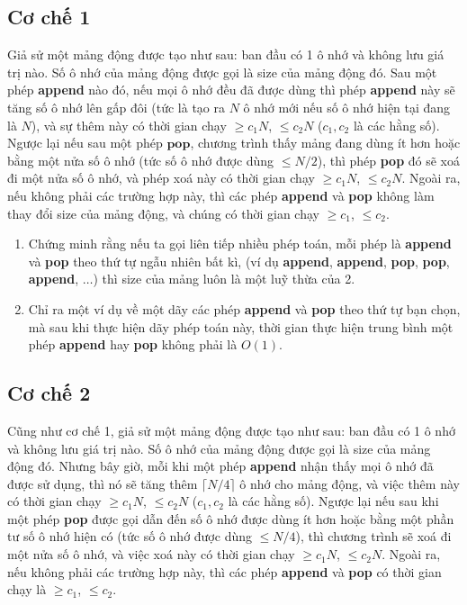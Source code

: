 \documentclass{article}
\begin{document}
\subsection{Cơ chế 1}
Giả sử một mảng động được tạo như sau: ban đầu có 1 ô nhớ và không lưu giá trị nào. Số ô nhớ của mảng động được gọi là size của mảng động đó. Sau một phép \textbf{append} nào đó, nếu mọi ô nhớ đều đã được dùng thì phép \textbf{append} này sẽ tăng số ô nhớ lên gấp đôi (tức là tạo ra $N$ ô nhớ mới nếu số ô nhớ hiện tại đang là $N$), và sự thêm này có thời gian chạy $\geq c_1 N$, $\leq c_2 N$ ($c_1, c_2$ là các hằng số). Ngược lại nếu sau một phép $\textbf{pop}$, chương trình thấy mảng đang dùng ít hơn hoặc bằng một nửa số ô nhớ (tức số ô nhớ được dùng $\leq N/2$), thì phép \textbf{pop} đó sẽ xoá đi một nửa số ô nhớ, và phép xoá này có thời gian chạy $\geq c_1 N$, $\leq c_2 N$. Ngoài ra, nếu không phải các trường hợp này, thì các phép \textbf{append} và \textbf{pop} không làm thay đổi size của mảng động, và chúng có thời gian chạy $\geq c_1$, $\leq c_2$. 
\begin{em}
    \begin{enumerate}
        \item Chứng minh rằng nếu ta gọi liên tiếp nhiều phép toán, mỗi phép là \textbf{append} và \textbf{pop} theo thứ tự ngẫu nhiên bất kì, (ví dụ \textbf{append}, \textbf{append}, \textbf{pop}, \textbf{pop}, \textbf{append}, $\ldots$) thì size của mảng luôn là một luỹ thừa của 2.
        
        \item Chỉ ra một ví dụ về một dãy các phép \textbf{append} và \textbf{pop} theo thứ tự bạn chọn, mà sau khi thực hiện dãy phép toán này, thời gian thực hiện trung bình một phép \textbf{append} hay \textbf{pop} không phải là $O(1)$.
    \end{enumerate}
\end{em}

\subsection{Cơ chế 2}
Cũng như cơ chế 1, giả sử một mảng động được tạo như sau: ban đầu có 1 ô nhớ và không lưu giá trị nào. Số ô nhớ của mảng động được gọi là size của mảng động đó. Nhưng bây giờ, mỗi khi một phép \textbf{append} nhận thấy mọi ô nhớ đã được sử dụng, thì nó sẽ tăng thêm $\lceil N/4 \rceil$ ô nhớ cho mảng động, và việc thêm này có thời gian chạy $\geq c_1 N$, $\leq c_2 N$ ($c_1, c_2$ là các hằng số). Ngược lại nếu sau khi một phép \textbf{pop} được gọi dẫn đến số ô nhớ được dùng ít hơn hoặc bằng một phần tư số ô nhớ hiện có (tức số ô nhớ được dùng $\leq N/4$), thì chương trình sẽ xoá đi một nửa số ô nhớ, và việc xoá này có thời gian chạy $\geq c_1 N$, $\leq c_2 N$. Ngoài ra, nếu không phải các trường hợp này, thì các phép \textbf{append} và \textbf{pop} có thời gian chạy là  $\geq c_1$, $\leq c_2$. \\
\end{document}
